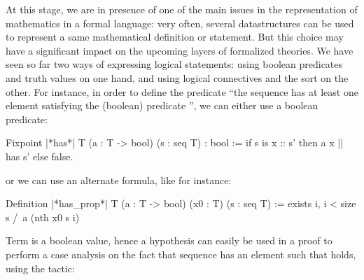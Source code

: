 \label{ch:boolrefl}





At this stage, we are in presence of one of the main issues in the
representation of mathematics in a formal language: very often,
several datastructures can be used to represent a same mathematical
definition or statement. But this choice may have a significant impact
on the upcoming layers of formalized theories. We have seen so far two
ways of expressing logical statements: using boolean predicates and
truth values on one hand, and using logical connectives and the
 sort on the other. For instance, in order to define the
predicate ``the sequence  has at least one element satisfying the
(boolean) predicate '', we can either use a boolean predicate:

\begin{coq}{}{}
Fixpoint |*has*| T (a : T -> bool) (s : seq T) : bool :=
  if s is x :: s' then a x || has s' else false.
\end{coq}

or we can use an alternate formula, like for instance:

\begin{coq}{}{}
Definition |*has_prop*|  T (a : T -> bool) (x0 : T) (s : seq T) :=
   exists i, i < size s /\ a (nth x0 s i)
\end{coq}

Term  is a boolean value, hence a hypothesis
 can easily be used in a proof to perform a case
analysis on the fact that sequence
 has an element such that  holds, using the  tactic:

